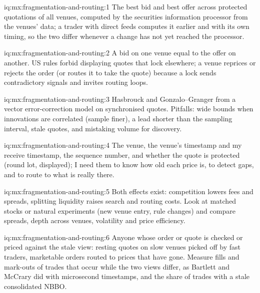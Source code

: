 \begin{solution}{iq:mx:fragmentation-and-routing:1}
The best bid and best offer across protected quotations of all venues, computed by the securities information processor from the venues' data; a trader
with direct feeds computes it earlier and with its own timing, so the two differ whenever a change has not yet reached the processor.
\end{solution}

\begin{solution}{iq:mx:fragmentation-and-routing:2}
A bid on one venue equal to the offer on another. US rules forbid displaying quotes that lock  elsewhere; a venue reprices or rejects the
order (or routes it to take the quote) because a lock sends contradictory signals and invites routing loops.
\end{solution}

\begin{solution}{iq:mx:fragmentation-and-routing:3}
Hasbrouck  and Gonzalo--Granger  from a vector error-correction model on synchronised quotes. Pitfalls: wide bounds
when innovations are correlated (sample finer), a lead shorter than the sampling interval, stale quotes, and mistaking volume for discovery.
\end{solution}

\begin{solution}{iq:mx:fragmentation-and-routing:4}
The venue, the venue's timestamp and my receive timestamp, the sequence number, and whether the quote is protected (round lot, displayed); I need them
to know how old each price is, to detect gaps, and to route to what is really there.
\end{solution}

\begin{solution}{iq:mx:fragmentation-and-routing:5}
Both effects exist: competition lowers fees and spreads, splitting liquidity raises search and routing costs. Look at matched stocks or natural
experiments (new venue entry, rule changes) and compare spreads, depth across venues, volatility and price efficiency.
\end{solution}

\begin{solution}{iq:mx:fragmentation-and-routing:6}
Anyone whose order or quote is checked or priced against the stale view: resting quotes on slow venues picked off by fast traders, marketable orders
routed to prices that have gone. Measure fills and mark-outs of trades that occur while the two views differ, as Bartlett and McCrary did with
microsecond timestamps, and the share of trades with a stale consolidated NBBO.
\end{solution}
